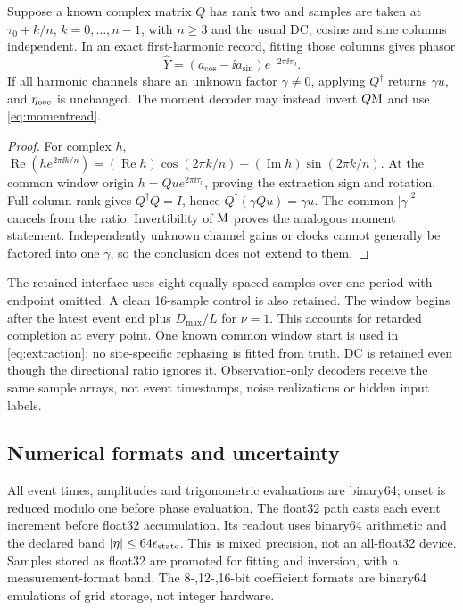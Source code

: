 \begin{proposition}\label{prop:observation}
Suppose a known complex matrix $Q$ has rank two and samples are taken at $\tau_0+k/n$, $k=0,\ldots,n-1$, with $n\ge3$ and the usual DC, cosine and sine columns independent. In an exact first-harmonic record, fitting those columns gives phasor
\begin{equation}\label{eq:extraction}
 \widehat Y=(a_{\cos}-\ii a_{\sin})e^{-2\pi\ii\tau_0}.
\end{equation}
If all harmonic channels share an unknown factor $\gamma\ne0$, applying $Q^\dagger$ returns $\gamma u$, and $\eta_{\rm osc}$ is unchanged. The moment decoder may instead invert $Q\mathrm M$ and use \eqref{eq:momentread}.
\end{proposition}
\begin{proof}
For complex $h$, $\operatorname{Re}(he^{2\pi\ii k/n})=(\operatorname{Re}h)\cos(2\pi k/n)-(\operatorname{Im}h)\sin(2\pi k/n)$. At the common window origin $h=Q u e^{2\pi\ii\tau_0}$, proving the extraction sign and rotation. Full column rank gives $Q^\dagger Q=I$, hence $Q^\dagger(\gamma Q u)=\gamma u$. The common $|\gamma|^2$ cancels from the ratio. Invertibility of $\mathrm M$ proves the analogous moment statement. Independently unknown channel gains or clocks cannot generally be factored into one $\gamma$, so the conclusion does not extend to them.
\end{proof}
The retained interface uses eight equally spaced samples over one period with endpoint omitted. A clean 16-sample control is also retained. The window begins after the latest event end plus $D_{\max}/L$ for $\nu=1$. This accounts for retarded completion at every point. One known common window start is used in \eqref{eq:extraction}; no site-specific rephasing is fitted from truth. DC is retained even though the directional ratio ignores it. Observation-only decoders receive the same sample arrays, not event timestamps, noise realizations or hidden input labels.

\subsection{Numerical formats and uncertainty}
All event times, amplitudes and trigonometric evaluations are binary64; onset is reduced modulo one before phase evaluation. The float32 path casts each event increment before float32 accumulation. Its readout uses binary64 arithmetic and the declared band $|\eta|\le64\epsilon_{\rm state}$. This is mixed precision, not an all-float32 device. Samples stored as float32 are promoted for fitting and inversion, with a measurement-format band. The 8-,12-,16-bit coefficient formats are binary64 emulations of grid storage, not integer hardware.

